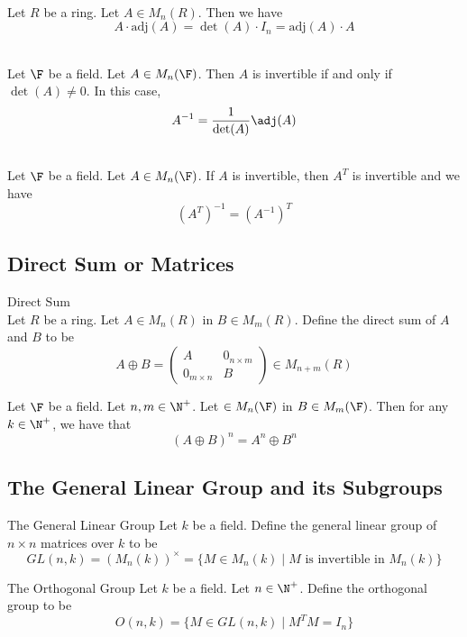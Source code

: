 \documentclass[a4paper]{article}
\begin{document}
\begin{prp}{}{}\\
Let $R$ be a ring. Let $A\in M_n(R)$. Then we have $$A\cdot\text{adj}(A)=\det(A)\cdot I_n=\text{adj}(A)\cdot A$$
\end{prp}

\begin{prp}{}{}\\
Let $\F$ be a field. Let $A\in M_n(\F)$. Then $A$ is invertible if and only if $\det(A)\neq 0$. In this case, $$A^{-1}=\frac{1}{\det(A)}\adj(A)$$
\end{prp}

\begin{prp}{}{}\\
Let $\F$ be a field. Let $A\in M_n(\F)$. If $A$ is invertible, then $A^T$ is invertible and we have $$(A^T)^{-1}=(A^{-1})^T$$
\end{prp}

\subsection{Direct Sum or Matrices}
\begin{defn}{Direct Sum}{}\\
Let $R$ be a ring. Let $A\in M_n(R)$ in $B\in M_m(R)$. Define the direct sum of $A$ and $B$ to be $$A\oplus B=\begin{pmatrix}
A & 0_{n\times m}\\
0_{m\times n} & B
\end{pmatrix}\in M_{n+m}(R)$$
\end{defn}

\begin{lmm}{}{} Let $\F$ be a field. Let $n,m\in\N^+$. Let $\in M_n(\F)$ in $B\in M_m(\F)$. Then for any $k\in\N^+$, we have that $$(A\oplus B)^n=A^n\oplus B^n$$
\end{lmm}

\subsection{The General Linear Group and its Subgroups}
\begin{defn}{The General Linear Group}{} Let $k$ be a field. Define the general linear group of $n\times n$ matrices over $k$ to be $$ GL(n,k)=(M_n(k))^\times=\{M\in M_n(k)\;|\;M\text{ is invertible in }M_n(k)\}$$
\end{defn}

\begin{defn}{The Orthogonal Group}{} Let $k$ be a field. Let $n\in\N^+$. Define the orthogonal group to be $$O(n,k)=\{M\in GL(n,k)\;|\;M^TM=I_n\}$$
\end{defn}
\end{document}
